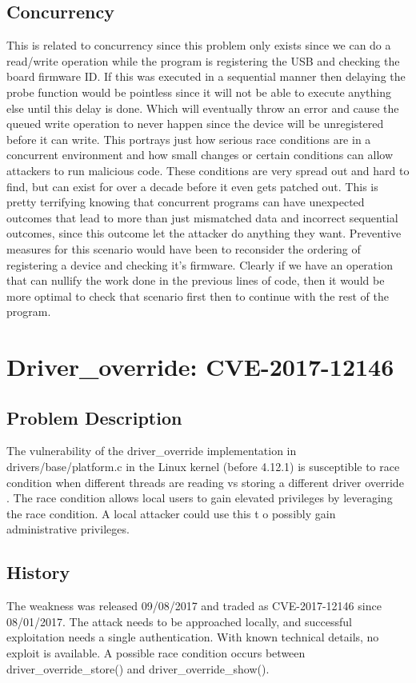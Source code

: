 \documentclass[12pt]{article}
\begin{document}
\subsection{Concurrency}
This is related to concurrency since this problem only exists since we can do a read/write operation while the program is registering the USB and checking the board firmware ID. If this was executed in a sequential manner then delaying the probe function would be pointless since it will not be able to execute anything else until this delay is done. Which will eventually throw an error and cause the queued write operation to never happen since the device will be unregistered before it can write. This portrays just how serious race conditions are in a concurrent environment and how small changes or certain conditions can allow attackers to run malicious code. These conditions are very spread out and hard to find, but can exist for over a decade before it even gets patched out. This is pretty terrifying knowing that concurrent programs can have unexpected outcomes that lead to more than just mismatched data and incorrect sequential outcomes, since this outcome let the attacker do anything they want. Preventive measures for this scenario would have been to reconsider the ordering of registering a device and checking it's firmware. Clearly if we have an operation that can nullify the work done in the previous lines of code, then it would be more optimal to check that scenario first then to continue with the rest of the program.


\section{Driver\_override: CVE-2017-12146}
\subsection{Problem Description}
The vulnerability of the driver\_override implementation in drivers/base/platform.c in the Linux kernel (before 4.12.1) is susceptible to race condition when different threads are reading vs storing a different driver override \cite{bugzilla}. The race condition allows local users to gain elevated privileges by leveraging the race condition. A local attacker could use this t o possibly gain administrative privileges\cite{ubuntu-security}.

\subsection{History}
The weakness was released 09/08/2017 and traded as CVE-2017-12146 since 08/01/2017. The attack needs to be approached locally, and successful exploitation needs a single authentication. With known technical details, no exploit is available\cite{vuldb}. A possible race condition occurs between driver\_override\_store() and driver\_override\_show().
\end{document}
